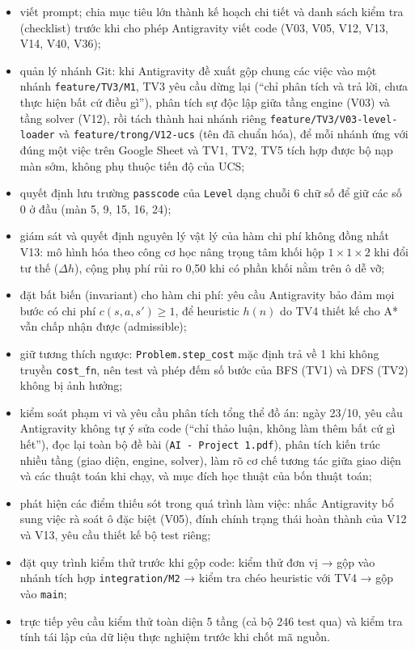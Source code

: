 \begin{itemize}
\tightlist
\item
  viết prompt; chia mục tiêu lớn thành kế hoạch chi tiết và danh sách kiểm tra (checklist) trước khi cho phép Antigravity viết code (V03, V05, V12, V13, V14, V40, V36);
\item
  quản lý nhánh Git: khi Antigravity đề xuất gộp chung các việc vào một nhánh \texttt{feature/\allowbreak{}TV3/\allowbreak{}M1}, TV3 yêu cầu dừng lại (``chỉ phân tích và trả lời, chưa thực hiện bất cứ điều gì''), phân tích sự độc lập giữa tầng engine (V03) và tầng solver (V12), rồi tách thành hai nhánh riêng \texttt{feature/\allowbreak{}TV3/\allowbreak{}V03-\allowbreak{}level-\allowbreak{}loader} và \texttt{feature/\allowbreak{}trong/\allowbreak{}V12-\allowbreak{}ucs} (tên đã chuẩn hóa), để mỗi nhánh ứng với đúng một việc trên Google Sheet và TV1, TV2, TV5 tích hợp được bộ nạp màn sớm, không phụ thuộc tiến độ của UCS;
\item
  quyết định lưu trường \texttt{passcode} của \texttt{Level} dạng chuỗi 6 chữ số để giữ các số 0 ở đầu (màn 5, 9, 15, 16, 24);
\item
  giám sát và quyết định nguyên lý vật lý của hàm chi phí không đồng nhất V13: mô hình hóa theo công cơ học nâng trọng tâm khối hộp \(1 \times 1 \times 2\) khi đổi tư thế (\(\Delta h\)), cộng phụ phí rủi ro 0,50 khi có phần khối nằm trên ô dễ vỡ;
\item
  đặt bất biến (invariant) cho hàm chi phí: yêu cầu Antigravity bảo đảm mọi bước có chi phí \(c(s, a, s') \ge 1\), để heuristic \(h(n)\) do TV4 thiết kế cho A* vẫn chấp nhận được (admissible);
\item
  giữ tương thích ngược: \texttt{Problem.\allowbreak{}step\_\allowbreak{}cost} mặc định trả về 1 khi không truyền \texttt{cost\_\allowbreak{}fn}, nên test và phép đếm số bước của BFS (TV1) và DFS (TV2) không bị ảnh hưởng;
\item
  kiểm soát phạm vi và yêu cầu phân tích tổng thể đồ án: ngày 23/10, yêu cầu Antigravity không tự ý sửa code (``chỉ thảo luận, không làm thêm bất cứ gì hết''), đọc lại toàn bộ đề bài (\texttt{AI -\allowbreak{} Project 1.\allowbreak{}pdf}), phân tích kiến trúc nhiều tầng (giao diện, engine, solver), làm rõ cơ chế tương tác giữa giao diện và các thuật toán khi chạy, và mục đích học thuật của bốn thuật toán;
\item
  phát hiện các điểm thiếu sót trong quá trình làm việc: nhắc Antigravity bổ sung việc rà soát ô đặc biệt (V05), đính chính trạng thái hoàn thành của V12 và V13, yêu cầu thiết kế bộ test riêng;
\item
  đặt quy trình kiểm thử trước khi gộp code: kiểm thử đơn vị → gộp vào nhánh tích hợp \texttt{integration/\allowbreak{}M2} → kiểm tra chéo heuristic với TV4 → gộp vào \texttt{main};
\item
  trực tiếp yêu cầu kiểm thử toàn diện 5 tầng (cả bộ 246 test qua) và kiểm tra tính tái lập của dữ liệu thực nghiệm trước khi chốt mã nguồn.
\end{itemize}

